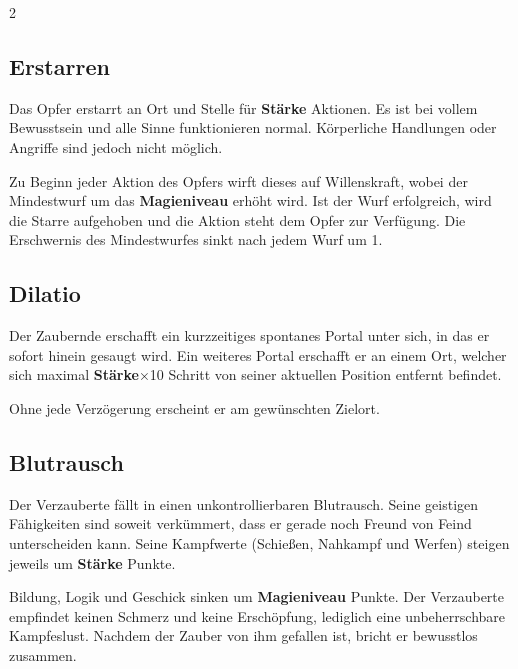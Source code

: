 \begin{multicols*}{2}
\subsection{Erstarren}

Das Opfer erstarrt an Ort und Stelle für \textbf{Stärke} Aktionen. Es ist bei vollem Bewusstsein und alle Sinne funktionieren normal. Körperliche Handlungen oder Angriffe sind jedoch nicht möglich.

Zu Beginn jeder Aktion des Opfers wirft dieses auf Willenskraft, wobei der Mindestwurf um das \textbf{Magieniveau} erhöht wird. Ist der Wurf erfolgreich, wird die Starre aufgehoben und die Aktion steht dem Opfer zur Verfügung. Die Erschwernis des Mindestwurfes sinkt nach jedem Wurf um 1.



\subsection{Dilatio}

Der Zaubernde erschafft ein kurzzeitiges spontanes Portal unter sich, in das er sofort hinein gesaugt wird. Ein weiteres Portal erschafft er an einem Ort, welcher sich maximal \textbf{Stärke}×10 Schritt von seiner aktuellen Position entfernt befindet.

Ohne jede Verzögerung erscheint er am gewünschten Zielort.



\subsection{Blutrausch}

Der Verzauberte fällt in einen unkontrollierbaren Blutrausch. Seine geistigen Fähigkeiten sind soweit verkümmert, dass er gerade noch Freund von Feind unterscheiden kann. Seine Kampfwerte (Schießen, Nahkampf und Werfen) steigen jeweils um \textbf{Stärke} Punkte.

Bildung, Logik und Geschick sinken um \textbf{Magieniveau} Punkte. Der Verzauberte empfindet keinen Schmerz und keine Erschöpfung, lediglich eine unbeherrschbare Kampfeslust. Nachdem der Zauber von ihm gefallen ist, bricht er bewusstlos zusammen.


\end{multicols*}
